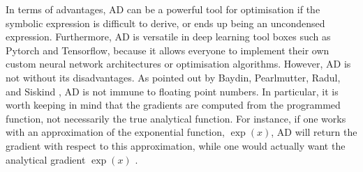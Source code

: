 In terms of advantages, AD can be a powerful tool for optimisation if the symbolic expression is difficult to derive, or ends up being an uncondensed expression.
Furthermore, AD is versatile in deep learning tool boxes such as Pytorch and Tensorflow,
because it allows everyone to implement their own custom neural network architectures or optimisation algorithms.
However, AD is not without its disadvantages. As pointed out by Baydin, Pearlmutter, Radul, and Siskind \cite{baydin2018automatic},
AD is not immune to floating point numbers.
In particular, it is worth keeping in mind that the gradients are computed from the programmed function, not necessarily the true analytical function.
For instance, if one works with an approximation of the exponential function, $\exp(x)$, AD will return the gradient with respect to this approximation,
while one would actually want the analytical gradient $\exp(x)$ \cite{baydin2018automatic}. %







